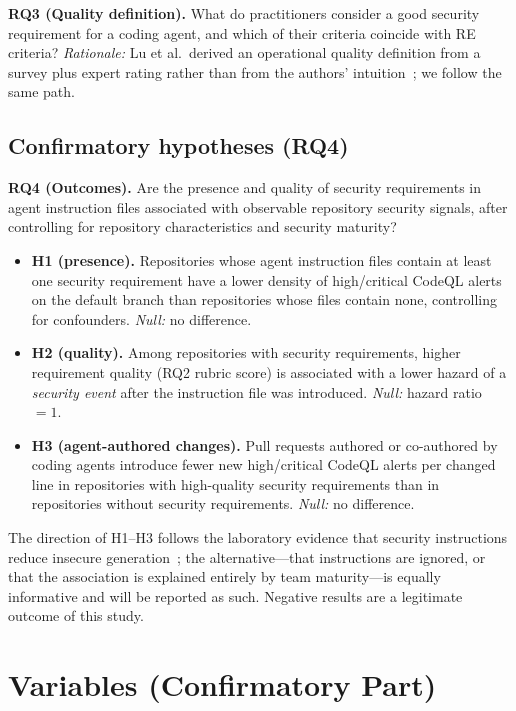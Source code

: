 \documentclass[10pt,conference]{IEEEtran}
\begin{document}
\textbf{RQ3 (Quality definition).} What do practitioners consider a good security requirement for a coding agent, and which of their criteria coincide with RE criteria? \emph{Rationale:} Lu et al.\ derived an operational quality definition from a survey plus expert rating rather than from the authors' intuition~\cite{lu2026modelcard}; we follow the same path.

\subsection{Confirmatory hypotheses (RQ4)}

\textbf{RQ4 (Outcomes).} Are the presence and quality of security requirements in agent instruction files associated with observable repository security signals, after controlling for repository characteristics and security maturity?

\begin{itemize}
\item \textbf{H1 (presence).} Repositories whose agent instruction files contain at least one security requirement have a lower density of high/critical CodeQL alerts on the default branch than repositories whose files contain none, controlling for confounders. \emph{Null:} no difference.
\item \textbf{H2 (quality).} Among repositories with security requirements, higher requirement quality (RQ2 rubric score) is associated with a lower hazard of a \emph{security event} after the instruction file was introduced. \emph{Null:} hazard ratio $=1$.
\item \textbf{H3 (agent-authored changes).} Pull requests authored or co-authored by coding agents introduce fewer new high/critical CodeQL alerts per changed line in repositories with high-quality security requirements than in repositories without security requirements. \emph{Null:} no difference.
\end{itemize}

The direction of H1--H3 follows the laboratory evidence that security instructions reduce insecure generation~\cite{chen2026memory,han2026secreason}; the alternative---that instructions are ignored, or that the association is explained entirely by team maturity---is equally informative and will be reported as such. Negative results are a legitimate outcome of this study.

\section{Variables (Confirmatory Part)}
\end{document}
